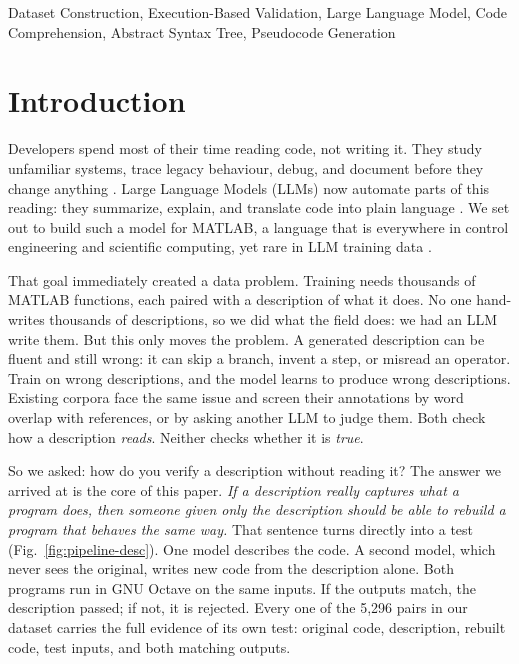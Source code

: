 \documentclass[conference]{IEEEtran}
\newcommand{\NAccepted}{5{,}296}           %
\begin{document}
\begin{IEEEkeywords}
Dataset Construction, Execution-Based Validation, Large Language Model, Code Comprehension, Abstract Syntax Tree, Pseudocode Generation
\end{IEEEkeywords}

\section{Introduction}
\label{sec:intro}

Developers spend most of their time reading code, not writing it. They study unfamiliar systems, trace legacy behaviour, debug, and document before they change anything \cite{4815280,10.1147/sj.282.0294,Fjeldstad1979,ko2007information}. Large Language Models (LLMs) now automate parts of this reading: they summarize, explain, and translate code into plain language \cite{yuan2023evaluatinginstructiontunedlargelanguage}. We set out to build such a model for MATLAB, a language that is everywhere in control engineering and scientific computing, yet rare in LLM training data \cite{qwen3technicalreport}.

That goal immediately created a data problem. Training needs thousands of MATLAB functions, each paired with a description of what it does. No one hand-writes thousands of descriptions, so we did what the field does: we had an LLM write them. But this only moves the problem. A generated description can be fluent and still wrong: it can skip a branch, invent a step, or misread an operator. Train on wrong descriptions, and the model learns to produce wrong descriptions. Existing corpora face the same issue and screen their annotations by word overlap with references, or by asking another LLM to judge them. Both check how a description \emph{reads}. Neither checks whether it is \emph{true}.

So we asked: how do you verify a description without reading it? The answer we arrived at is the core of this paper. \emph{If a description really captures what a program does, then someone given only the description should be able to rebuild a program that behaves the same way.} That sentence turns directly into a test (Fig.~\ref{fig:pipeline-desc}). One model describes the code. A second model, which never sees the original, writes new code from the description alone. Both programs run in GNU Octave on the same inputs. If the outputs match, the description passed; if not, it is rejected. Every one of the \NAccepted{} pairs in our dataset carries the full evidence of its own test: original code, description, rebuilt code, test inputs, and both matching outputs.
\end{document}
